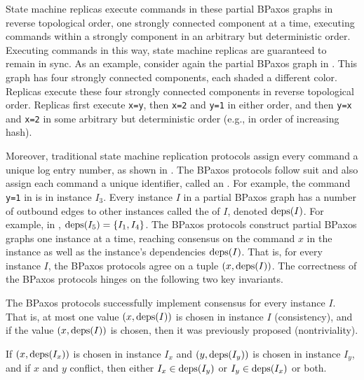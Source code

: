 State machine replicas execute commands in these partial BPaxos graphs in
reverse topological order, one strongly connected component at a time, executing
commands within a strongly component in an arbitrary but deterministic order.
Executing commands in this way, state machine replicas are guaranteed to remain
in sync. As an example, consider again the partial BPaxos graph in
. This graph has four strongly connected components, each
shaded a different color. Replicas execute these four strongly connected
components in reverse topological order. Replicas first execute \texttt{x=y},
then \texttt{x=2} and \texttt{y=1} in either order, and then \texttt{y=x} and
\texttt{x=2} in some arbitrary but deterministic order (e.g., in order of
increasing hash).

Moreover, traditional state machine replication protocols assign every command
a unique log entry number, as shown in . The BPaxos protocols
follow suit and also assign each command a unique identifier, called an
. For example, the command \texttt{y=1} in 
is in instance $I_3$. Every instance $I$ in a partial BPaxos graph has a number
of outbound edges to other instances called the  of $I$,
denoted $\text{deps}(I)$. For example, in , $\text{deps}(I_5) = \{I_1,
I_4\}$.
%
The BPaxos protocols construct partial BPaxos graphs one instance at a time,
reaching consensus on the command $x$ in the instance as well as the instance's
dependencies $\text{deps}(I)$. That is, for every instance $I$, the BPaxos protocols
agree on a tuple $(x, \text{deps}(I))$.
%
The correctness of the BPaxos protocols hinges on the following two key
invariants.

\begin{invariant}
  The BPaxos protocols successfully implement consensus for every instance $I$.
  That is, at most one value $(x, \text{deps}(I))$ is chosen in instance $I$
  (consistency), and if the value $(x, \text{deps}(I))$ is chosen, then it was
  previously proposed (nontriviality).
\end{invariant}%
%
\begin{invariant}
  If $(x, \text{deps}(I_x))$ is chosen in instance $I_x$ and $(y, \text{deps}(I_y))$ is
  chosen in instance $I_y$, and if $x$ and $y$ conflict, then either $I_x \in
  \text{deps}(I_y)$ or $I_y \in \text{deps}(I_x)$ or both.
\end{invariant}

